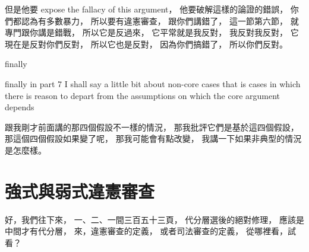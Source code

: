 \hypertarget{w06:cue:465}{}但是他要 expose the fallacy of this argument，
\hypertarget{w06:cue:466}{}他要破解這樣的論證的錯誤，
\hypertarget{w06:cue:467}{}你們都認為有多數暴力，
\hypertarget{w06:cue:468}{}所以要有違憲審查，
\hypertarget{w06:cue:469}{}跟你們講錯了，
\hypertarget{w06:cue:470}{}這一節第六節，
\hypertarget{w06:cue:471}{}就專門跟你講是錯戰，
\hypertarget{w06:cue:472}{}所以它是反過來，
\hypertarget{w06:cue:473}{}它平常就是我反對，
\hypertarget{w06:cue:474}{}我反對我反對，
\hypertarget{w06:cue:475}{}它現在是反對你們反對，
\hypertarget{w06:cue:476}{}所以它也是反對，
\hypertarget{w06:cue:477}{}因為你們搞錯了，
\hypertarget{w06:cue:478}{}所以你們反對。

\hypertarget{w06:cue:479}{}finally

\hypertarget{w06:cue:480}{}finally in part 7
\hypertarget{w06:cue:481}{}I shall say a little bit about non-core cases
\hypertarget{w06:cue:482}{}that is cases in which there is reason
\hypertarget{w06:cue:483}{}to depart from the assumptions
\hypertarget{w06:cue:484}{}on which the core argument depends

\hypertarget{w06:cue:485}{}跟我剛才前面講的那四個假設不一樣的情況，
\hypertarget{w06:cue:486}{}那我批評它們是基於這四個假設，
\hypertarget{w06:cue:487}{}那這個四個假設如果變了呢，
\hypertarget{w06:cue:488}{}那我可能會有點改變，
\hypertarget{w06:cue:489}{}我講一下如果非典型的情況是怎麼樣。

\section{強式與弱式違憲審查}

\hypertarget{w06:cue:490}{}好，我們往下來，
\hypertarget{w06:cue:491}{}一、二、一間三百五十三頁，
\hypertarget{w06:cue:492}{}代分層選後的絕對修理，
\hypertarget{w06:cue:493}{}應該是中間才有代分層，
\hypertarget{w06:cue:494}{}來，違憲審查的定義，
\hypertarget{w06:cue:495}{}或者司法審查的定義，
\hypertarget{w06:cue:496}{}從哪裡看，試看？


